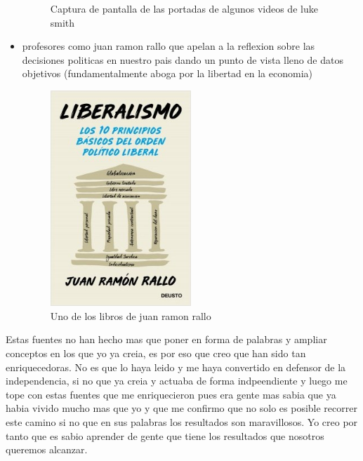 \begin{itemize}
{\begin{figure}[H]
			\caption{Captura de pantalla de las portadas de algunos videos de luke smith}
		\end{figure}
	}
\item {profesores como juan ramon rallo que apelan a la reflexion sobre las decisiones politicas en nuestro pais dando un punto de vista lleno de datos objetivos (fundamentalmente aboga por la libertad en la economia)
		\begin{figure}[H]
			\centering
			\includegraphics[width=0.5\textwidth]{figures/rallo.jpg}
			\caption{Uno de los libros de juan ramon rallo}
		\end{figure}
		}
\end{itemize}

Estas fuentes no han hecho mas que poner en forma de palabras y ampliar conceptos en los que yo ya creia, es por eso que creo que han sido tan enriquecedoras. No es que lo haya leido y me haya convertido en defensor de la independencia, si no que ya creia y actuaba de forma indpeendiente y luego me tope con estas fuentes que me enriquecieron pues era gente mas sabia que ya habia vivido mucho mas que yo y que me confirmo que no solo es posible recorrer este camino si no que en sus palabras los resultados son maravillosos. Yo creo por tanto que es sabio aprender de gente que tiene los resultados que nosotros queremos alcanzar.

